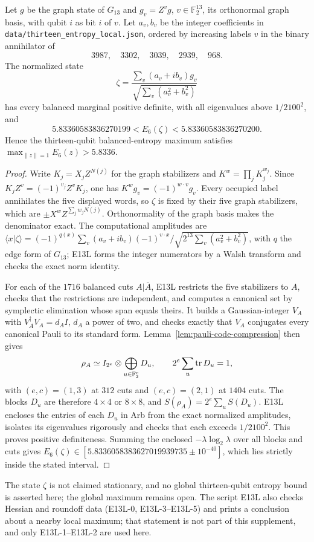 \begin{corollary}
\label{cor:thirteen-entropy-witness}
Let $g$ be the graph state of $G_{13}$ and $g_v=Z^vg$,
$v\in\mathbb F_2^{13}$, its orthonormal graph basis, with qubit $i$
as bit $i$ of $v$. Let $a_v,b_v$ be the integer coefficients in
\texttt{data/thirteen\_entropy\_local.json}, ordered by increasing
labels $v$ in the binary annihilator of
\[
                     3987,\quad3302,\quad3039,\quad2939,\quad968.
\]
The normalized state
\[
 \zeta=\frac{\sum_v(a_v+ib_v)g_v}{\sqrt{\sum_v(a_v^2+b_v^2)}}
\]
has every balanced marginal positive definite, with all eigenvalues
above $1/2100^2$, and
\[
       5.83360583836270199<E_6(\zeta)<5.83360583836270200.
\]
Hence the thirteen-qubit balanced-entropy maximum satisfies
$\max_{\|z\|=1}E_6(z)>5.8336$.
\end{corollary}
\begin{proof}
Write $K_j=X_jZ^{N(j)}$ for the graph stabilizers and
$K^w=\prod_jK_j^{w_j}$. Since $K_jZ^v=(-1)^{v_j}Z^vK_j$, one has
$K^wg_v=(-1)^{w\cdot v}g_v$. Every occupied label annihilates the five
displayed words, so $\zeta$ is fixed by their five graph
stabilizers, which are $\pm X^wZ^{\sum_jw_jN(j)}$.
Orthonormality of the graph basis makes the denominator exact.
The computational amplitudes are
$\langle x|\zeta\rangle=(-1)^{q(x)}\sum_v(a_v+ib_v)(-1)^{v\cdot x}
/\sqrt{2^{13}\sum_v(a_v^2+b_v^2)}$, with $q$ the edge form of $G_{13}$;
E13L forms the integer numerators by a Walsh transform and checks
the exact norm identity.

For each of the $1716$ balanced cuts $A|\bar A$, E13L restricts the
five stabilizers to $A$, checks that the restrictions are independent,
and computes a canonical set by symplectic elimination whose span
equals theirs. It builds a Gaussian-integer $V_A$ with
$V_A^\dagger V_A=d_AI$, $d_A$ a power of two, and checks exactly that
$V_A$ conjugates every canonical Pauli to its standard form.
Lemma~\ref{lem:pauli-code-compression} then gives
\[
 \rho_A\simeq I_{2^e}\otimes\bigoplus_{u\in\mathbb F_2^c}D_u,
 \qquad 2^e\sum_u\operatorname{tr} D_u=1,
\]
with $(e,c)=(1,3)$ at $312$ cuts and $(e,c)=(2,1)$ at $1404$ cuts.
The blocks $D_u$ are therefore $4\times4$ or $8\times8$, and
$S(\rho_A)=2^e\sum_uS(D_u)$.
E13L encloses the entries of each $D_u$ in Arb from the exact
normalized amplitudes, isolates its eigenvalues rigorously and checks
that each exceeds $1/2100^2$. This proves positive definiteness.
Summing the enclosed $-\lambda\log_2\lambda$ over all blocks and
cuts gives
$E_6(\zeta)\in[5.8336058383627019939735\pm10^{-40}]$, which lies
strictly inside the stated interval.
\end{proof}

\begin{remark}[Scope]
The state $\zeta$ is not claimed stationary, and no global
thirteen-qubit entropy bound is asserted here; the global maximum
remains open. The script E13L also checks Hessian and roundoff
data (E13L-0, E13L-3--E13L-5) and prints a conclusion about a nearby
local maximum; that statement is not part of this supplement, and only
E13L-1--E13L-2 are used here.
\end{remark}
